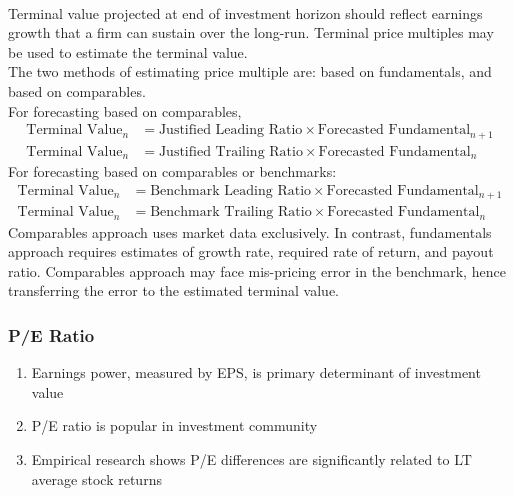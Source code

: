 \begin{method} \\
Terminal value projected at end of investment horizon should reflect earnings growth that a firm can sustain over the long-run. Terminal price multiples may be used to estimate the terminal value.\\
The two methods of estimating price multiple are: based on fundamentals, and based on comparables.\\
For forecasting based on comparables,
\begin{align}
\text{Terminal Value}_n &= \text{Justified Leading Ratio} \times \text{Forecasted Fundamental}_{n+1} \nonumber \\
\text{Terminal Value}_n &= \text{Justified Trailing Ratio} \times \text{Forecasted Fundamental}_{n} \nonumber
\end{align}
For forecasting based on comparables or benchmarks:
\begin{align}
\text{Terminal Value}_n &= \text{Benchmark Leading Ratio} \times \text{Forecasted Fundamental}_{n+1} \nonumber \\
\text{Terminal Value}_n &= \text{Benchmark Trailing Ratio} \times \text{Forecasted Fundamental}_{n} \nonumber
\end{align}
Comparables approach uses market data exclusively. In contrast, fundamentals approach requires estimates of growth rate, required rate of return, and payout ratio. Comparables approach may face mis-pricing error in the benchmark, hence transferring the error to the estimated terminal value.
\end{method}

\subsubsection{P/E Ratio}

\begin{remark} 
\begin{enumerate}[label=\roman*.]
\setlength{\itemsep}{0pt}
\item Earnings power, measured by EPS, is primary determinant of investment value
\item P/E ratio is popular in investment community
\item Empirical research shows P/E differences are significantly related to LT average stock returns
\end{enumerate}
\end{remark}

